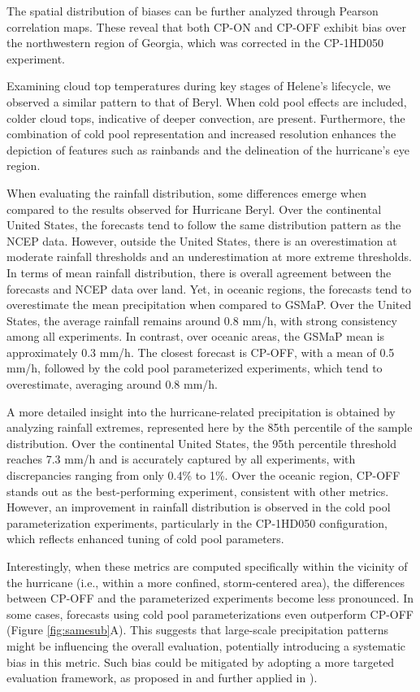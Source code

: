 The spatial distribution of biases can be further analyzed through Pearson correlation maps. These reveal that both CP-ON and CP-OFF exhibit bias over the northwestern region of Georgia, which was corrected in the CP-1HD050 experiment.

Examining cloud top temperatures during key stages of Helene’s lifecycle, we observed a similar pattern to that of Beryl. When cold pool effects are included, colder cloud tops, indicative of deeper convection, are present. Furthermore, the combination of cold pool representation and increased resolution enhances the depiction of features such as rainbands and the delineation of the hurricane’s eye region.

When evaluating the rainfall distribution, some differences emerge when compared to the results observed for Hurricane Beryl. Over the continental United States, the forecasts tend to follow the same distribution pattern as the NCEP data. However, outside the United States, there is an overestimation at moderate rainfall thresholds and an underestimation at more extreme thresholds. In terms of mean rainfall distribution, there is overall agreement between the forecasts and NCEP data over land. Yet, in oceanic regions, the forecasts tend to overestimate the mean precipitation when compared to GSMaP. Over the United States, the average rainfall remains around 0.8 mm/h, with strong consistency among all experiments. In contrast, over oceanic areas, the GSMaP mean is approximately 0.3 mm/h. The closest forecast is CP-OFF, with a mean of 0.5 mm/h, followed by the cold pool parameterized experiments, which tend to overestimate, averaging around 0.8 mm/h.

A more detailed insight into the hurricane-related precipitation is obtained by analyzing rainfall extremes, represented here by the 85th percentile of the sample distribution. Over the continental United States, the 95th percentile threshold reaches 7.3 mm/h and is accurately captured by all experiments, with discrepancies ranging from only 0.4\% to 1\%. Over the oceanic region, CP-OFF stands out as the best-performing experiment, consistent with other metrics. However, an improvement in rainfall distribution is observed in the cold pool parameterization experiments, particularly in the CP-1HD050 configuration, which reflects enhanced tuning of cold pool parameters.

Interestingly, when these metrics are computed specifically within the vicinity of the hurricane (i.e., within a more confined, storm-centered area), the differences between CP-OFF and the parameterized experiments become less pronounced. In some cases, forecasts using cold pool parameterizations even outperform CP-OFF (Figure \ref{fig:samesub}A). This suggests that large-scale precipitation patterns might be influencing the overall evaluation, potentially introducing a systematic bias in this metric. Such bias could be mitigated by adopting a more targeted evaluation framework, as proposed in  and further applied in ).

